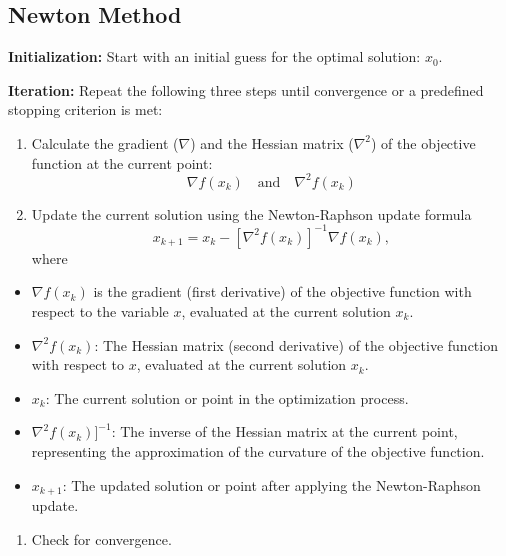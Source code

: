 \documentclass[
  letterpaper,
  DIV=11,
  numbers=noendperiod]{scrreprt}
\providecommand{\tightlist}{%
  \setlength{\itemsep}{0pt}\setlength{\parskip}{0pt}}\usepackage{longtable,booktabs,array}
\begin{document}
\begin{tcolorbox}
\begin{figure}[H]
{}

\end{figure}

\end{tcolorbox}

\hypertarget{newton-method}{%
\subsection{Newton Method}\label{newton-method}}

\textbf{Initialization:} Start with an initial guess for the optimal
solution: \(x_0\).

\textbf{Iteration:} Repeat the following three steps until convergence
or a predefined stopping criterion is met:

\begin{enumerate}
\def\labelenumi{\arabic{enumi})}
\item
  Calculate the gradient (\(\nabla\)) and the Hessian matrix
  (\(\nabla^2\)) of the objective function at the current point:
  \[\nabla f(x_k) \quad \text{and} \quad \nabla^2 f(x_k)\]
\item
  Update the current solution using the Newton-Raphson update formula
  \[x_{k+1} = x_k - [\nabla^2 f(x_k)]^{-1} \nabla f(x_k),\] where
\end{enumerate}

\begin{itemize}
\tightlist
\item
  \(\nabla f(x_k)\) is the gradient (first derivative) of the objective
  function with respect to the variable \(x\), evaluated at the current
  solution \(x_k\).
\item
  \(\nabla^2 f(x_k)\): The Hessian matrix (second derivative) of the
  objective function with respect to \(x\), evaluated at the current
  solution \(x_k\).
\item
  \(x_k\): The current solution or point in the optimization process.
\item
  \(\nabla^2 f(x_k)]^{-1}\): The inverse of the Hessian matrix at the
  current point, representing the approximation of the curvature of the
  objective function.
\item
  \(x_{k+1}\): The updated solution or point after applying the
  Newton-Raphson update.
\end{itemize}

\begin{enumerate}
\def\labelenumi{\arabic{enumi})}
\setcounter{enumi}{2}
\tightlist
\item
  Check for convergence.
\end{enumerate}
\end{document}
